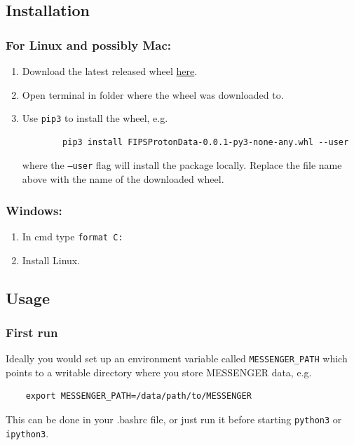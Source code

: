 	\subsection{Installation}
	\subsubsection{For Linux and possibly Mac:}
	\begin{enumerate}
		\item Download the latest released wheel \href{https://github.com/mattkjames7/FIPSProtonData/releases/download/0.0.1/FIPSProtonData-0.0.1-py3-none-any.whl}{here}.
		\item Open terminal in folder where the wheel was downloaded to.
		\item Use \texttt{pip3} to install the wheel, e.g. 
		\begin{verbatim}
		pip3 install FIPSProtonData-0.0.1-py3-none-any.whl --user
		\end{verbatim}
		where the \texttt{--user} flag will install the package locally. Replace 
		the file name above with the name of the downloaded wheel.
	\end{enumerate}
	
	\subsubsection{Windows:}
	\begin{enumerate}
		\item In cmd type \texttt{format C:}
		\item Install Linux.
	\end{enumerate}
	
	\subsection{Usage}
	\subsubsection{First run}
	Ideally you would set up an environment variable called 
	\texttt{MESSENGER\_PATH} which points to a writable directory where you store 
	MESSENGER data, e.g. 
	\begin{verbatim}
	export MESSENGER_PATH=/data/path/to/MESSENGER
	\end{verbatim}
	This can be done in your .bashrc file, or just run it before
	starting \texttt{python3} or \texttt{ipython3}.
	
